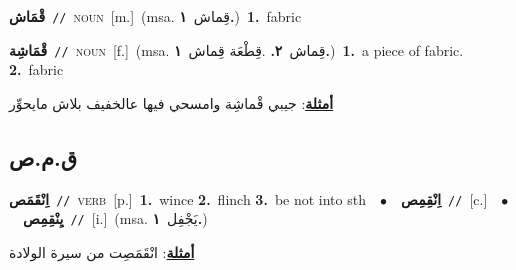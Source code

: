 \documentclass[10pt,a4paper,twoside]{article} %
\begin{document}
\begin{multicols}{2}
{\setlength\topsep{0pt}\textbf{\foreignlanguage{arabic}{قْمَاش}}\ {\color{gray}\texttt{//}\color{black}}\ \textsc{noun}\ [m.]\ \color{gray}(msa. \foreignlanguage{arabic}{قِماش}~\foreignlanguage{arabic}{\textbf{١.}})\color{black}\ \textbf{1.}~fabric\ } \vspace{2mm}

{\setlength\topsep{0pt}\textbf{\foreignlanguage{arabic}{قْمَاشِة}}\ {\color{gray}\texttt{//}\color{black}}\ \textsc{noun}\ [f.]\ \color{gray}(msa. \foreignlanguage{arabic}{قِماش}~\foreignlanguage{arabic}{\textbf{٢.}}  .\foreignlanguage{arabic}{قِطْعَة قِماش}~\foreignlanguage{arabic}{\textbf{١.}})\color{black}\ \textbf{1.}~a piece of fabric.  \textbf{2.}~fabric\  \begin{flushright}\color{gray}\foreignlanguage{arabic}{\textbf{\underline{\foreignlanguage{arabic}{أمثلة}}}: جيبي قْماشِة وامسحي فيها عالخفيف بلاش مايحوِّر}\end{flushright}\color{black}} \vspace{2mm}

\vspace{-3mm}
\subsection*{\color{blue}\foreignlanguage{arabic}{ق.م.ص}\color{blue}{}} 

{\setlength\topsep{0pt}\textbf{\foreignlanguage{arabic}{اِنْقَمَص}}\ {\color{gray}\texttt{//}\color{black}}\ \textsc{verb}\ [p.]\ \textbf{1.}~wince  \textbf{2.}~flinch  \textbf{3.}~be not into sth\ \ $\bullet$\ \ \setlength\topsep{0pt}\textbf{\foreignlanguage{arabic}{اِنْقِمِص}}\ {\color{gray}\texttt{//}\color{black}}\ [c.]\ \ $\bullet$\ \ \setlength\topsep{0pt}\textbf{\foreignlanguage{arabic}{يِنْقِمِص}}\ {\color{gray}\texttt{//}\color{black}}\ [i.]\ \color{gray}(msa. \foreignlanguage{arabic}{يَجْفِل}~\foreignlanguage{arabic}{\textbf{١.}})\color{black}\  \begin{flushright}\color{gray}\foreignlanguage{arabic}{\textbf{\underline{\foreignlanguage{arabic}{أمثلة}}}: انْقَمَصِت من سيرة الولادة}\end{flushright}\color{black}} \vspace{2mm}


\end{multicols}
\end{document}
